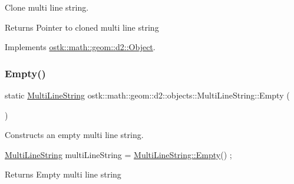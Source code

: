 Clone multi line string. 

\begin{DoxyReturn}{Returns}
Pointer to cloned multi line string 
\end{DoxyReturn}


Implements \hyperlink{classostk_1_1math_1_1geom_1_1d2_1_1_object_a98dedc6792aef35308966ca768eb3e14}{ostk\+::math\+::geom\+::d2\+::\+Object}.

\mbox{\label{classostk_1_1math_1_1geom_1_1d2_1_1objects_1_1_multi_line_string_a1f0815649194309c185ac3020b9d80a2}} 
\subsubsection{\texorpdfstring{Empty()}{Empty()}}
{\footnotesize\ttfamily static \hyperlink{classostk_1_1math_1_1geom_1_1d2_1_1objects_1_1_multi_line_string}{Multi\+Line\+String} ostk\+::math\+::geom\+::d2\+::objects\+::\+Multi\+Line\+String\+::\+Empty (\begin{DoxyParamCaption}{ }\end{DoxyParamCaption})\hspace{0.3cm}{\ttfamily [static]}}



Constructs an empty multi line string. 


\begin{DoxyCode}
\hyperlink{classostk_1_1math_1_1geom_1_1d2_1_1objects_1_1_multi_line_string_a5a30febbcbc28097e34b6f2f3f456b79}{MultiLineString} multiLineString = \hyperlink{classostk_1_1math_1_1geom_1_1d2_1_1objects_1_1_multi_line_string_a1f0815649194309c185ac3020b9d80a2}{MultiLineString::Empty}() ;
\end{DoxyCode}


\begin{DoxyReturn}{Returns}
Empty multi line string 
\end{DoxyReturn}
\mbox{\label{classostk_1_1math_1_1geom_1_1d2_1_1objects_1_1_multi_line_string_ac2e17ceb1a3f276273c5276a5d0a4ea2}} 
